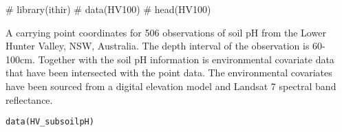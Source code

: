 \documentclass[a4paper]{book}
\begin{document}
%
\begin{Examples}
\begin{ExampleCode}

# library(ithir)
# data(HV100)
# head(HV100)

\end{ExampleCode}
\end{Examples}
%
\begin{Description}
A  carrying point coordinates for 506 observations of soil pH from the Lower Hunter Valley, NSW, Australia. The depth interval of the observation is 60-100cm. Together with the soil pH information is environmental covariate data that have been intersected with the point data. The environmental covariates have been sourced from a digital elevation model and Landsat 7 spectral band reflectance.
\end{Description}
%
\begin{Usage}
\begin{verbatim}
data(HV_subsoilpH)
\end{verbatim}
\end{Usage}
%
\end{document}
